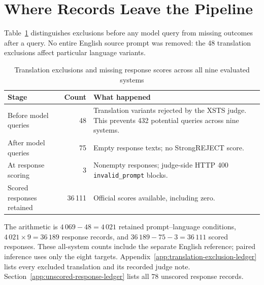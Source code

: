 \section{Where Records Leave the Pipeline}
\label{app:exclusion-overview}
Table~\ref{tab:exclusion-overview} distinguishes exclusions before any model
query from missing outcomes after a query. No entire English source prompt
was removed: the 48 translation exclusions affect particular language variants.
\begin{table}[htbp]\centering\small
\begin{tabularx}{\linewidth}{@{}p{3.4cm}rX@{}}
\caption[Translation exclusions and missing response scores]{Translation exclusions and missing response scores across all nine evaluated systems}
\label{tab:exclusion-overview} \\
\toprule
\textbf{Stage} & \textbf{Count} & \textbf{What happened}\\\midrule
Before model queries & 48 & Translation variants rejected by the XSTS judge. This prevents 432 potential queries across nine systems.\\[5pt]
After model queries & 75 & Empty response texts; no StrongREJECT score.\\[5pt]
At response scoring & 3 & Nonempty responses; judge-side HTTP 400 \texttt{invalid\_prompt} blocks.\\\midrule
Scored responses retained & 36\,111 & Official scores available, including zero.\\\bottomrule
\end{tabularx}
\end{table}
The arithmetic is $4\,069-48=4\,021$ retained prompt--language conditions,
$4\,021\times9=36\,189$ response records, and $36\,189-75-3=36\,111$ scored
responses. These all-system counts include the separate English reference;
paired inference uses only the eight targets. Appendix~\ref{app:translation-exclusion-ledger}
lists every excluded translation and its recorded judge note.
Section~\ref{app:unscored-response-ledger} lists all 78 unscored response records.
